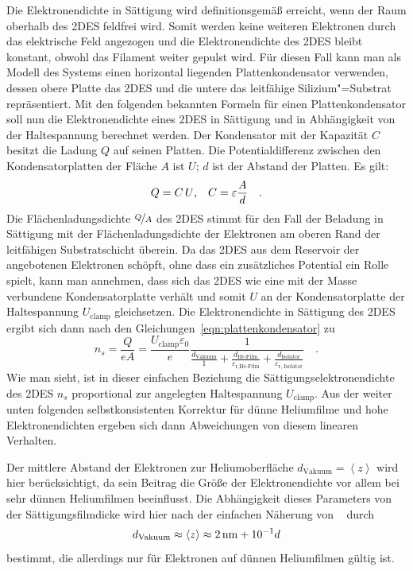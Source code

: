 Die Elektronendichte in Sättigung wird definitionsgemäß erreicht, wenn der Raum oberhalb des 2DES feldfrei wird. Somit werden keine weiteren Elektronen durch das elektrische Feld angezogen und die Elektronendichte des 2DES bleibt konstant, obwohl das Filament weiter gepulst wird. Für diesen Fall kann man als Modell des Systems einen horizontal liegenden Plattenkondensator verwenden, dessen obere Platte das 2DES und die untere das leitfähige Silizium"=Substrat repräsentiert. Mit den folgenden bekannten Formeln für einen Plattenkondensator soll nun die Elektronendichte eines 2DES in Sättigung und in Abhängigkeit von der Haltespannung berechnet werden. Der Kondensator mit der Kapazität $C$ besitzt die Ladung $Q$ auf seinen Platten. Die Potentialdifferenz zwischen den Kondensatorplatten der Fläche $A$ ist $U$; $d$ ist der Abstand der Platten. Es gilt: 
\begin{equation}
    \label{eqn:plattenkondensator}
    Q=C\,U\text{,}\quad
    C=\varepsilon\frac{A}{d}\quad.
\end{equation}
Die Flächenladungsdichte $\nicefrac{Q}{A}$ des 2DES stimmt für den Fall der Beladung in Sättigung mit der Flächenladungsdichte der Elektronen am oberen Rand der leitfähigen Substratschicht überein. Da das 2DES aus dem Reservoir der angebotenen Elektronen schöpft, ohne dass ein zusätzliches Potential ein Rolle spielt, kann man annehmen, dass sich das 2DES wie eine mit der Masse verbundene Kondensatorplatte verhält und somit $U$ an der Kondensatorplatte der Haltespannung $U_\text{clamp}$ gleichsetzen. Die Elektronendichte in Sättigung des 2DES ergibt sich dann nach den Gleichungen~\eqref{eqn:plattenkondensator} zu
\begin{equation}
    \label{eqn:elektronendichte}
    n_s=\frac{Q}{e A}=
    \frac{U_\text{clamp}\varepsilon_0}{e}\frac1{
        \frac{d_\text{Vakuum}}{1}+
        \frac{d_\text{He-Film}}{\varepsilon_\text{r,He-Film}}+
        \frac{d_\text{Isolator}}{\varepsilon_\text{r, Isolator}}}\quad.
\end{equation}
Wie man sieht, ist in dieser einfachen Beziehung die Sättigungselektronendichte des 2DES $n_s$ proportional zur angelegten Haltespannung $U_\text{clamp}$. Aus der weiter unten folgenden selbstkonsistenten Korrektur für dünne Heliumfilme und hohe Elektronendichten ergeben sich dann Abweichungen von diesem linearen Verhalten.

Der mittlere Abstand der Elektronen zur Heliumoberfläche $d_\text{Vakuum}=\left<z\right>$ wird hier berücksichtigt, da sein Beitrag die Größe der Elektronendichte vor allem bei sehr dünnen Heliumfilmen beeinflusst. Die Abhängigkeit dieses Parameters von der Sättigungsfilmdicke wird hier nach der einfachen Näherung von  \ea\ \cite{Hu90} durch
\begin{equation}
	d_\text{Vakuum}\approx\left<z\right>\approx\unit[2]{nm} + 10^{-1}d
\end{equation}
bestimmt, die allerdings nur für Elektronen auf dünnen Heliumfilmen gültig ist.

